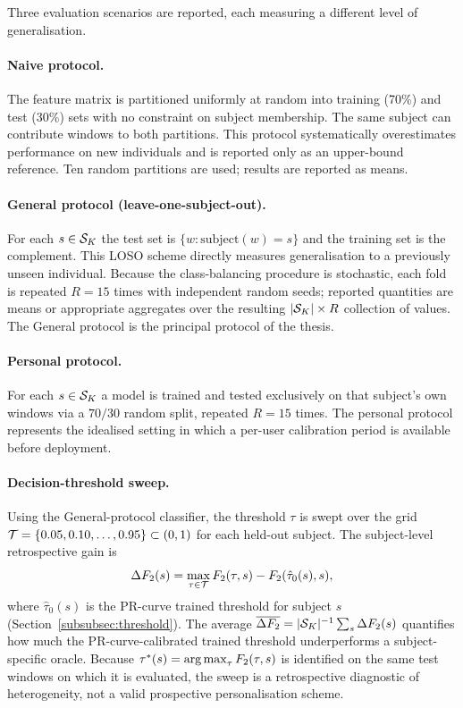 Three evaluation scenarios are reported, each measuring a different level of generalisation.

\paragraph{Naive protocol.}
The feature matrix is partitioned uniformly at random into training (70\%) and test (30\%) sets with no constraint on subject membership. The same subject can contribute windows to both partitions. This protocol systematically overestimates performance on new individuals and is reported only as an upper-bound reference. Ten random partitions are used; results are reported as means.

\paragraph{General protocol (leave-one-subject-out).}
For each $s\in\mathcal{S}_K$ the test set is $\{w:\text{subject}(w)=s\}$ and the training set is the complement. This LOSO scheme directly measures generalisation to a previously unseen individual. Because the class-balancing procedure is stochastic, each fold is repeated $R=15$ times with independent random seeds; reported quantities are means or appropriate aggregates over the resulting $|\mathcal{S}_K|\times R$ collection of values. The General protocol is the principal protocol of the thesis.

\paragraph{Personal protocol.}
For each $s\in\mathcal{S}_K$ a model is trained and tested exclusively on that subject's own windows via a $70/30$ random split, repeated $R=15$ times. The personal protocol represents the idealised setting in which a per-user calibration period is available before deployment.

\paragraph{Decision-threshold sweep.}
Using the General-protocol classifier, the threshold $\tau$ is swept over the grid $\mathcal{T}=\{0.05,0.10,\ldots,0.95\}\subset(0,1)$ for each held-out subject. The subject-level retrospective gain is
\begin{equation}
  \Delta F_2(s)=\max_{\tau\in\mathcal{T}}F_2(\tau,s)-F_2(\hat\tau_0(s),s),
  \label{eq:dF2}
\end{equation}
where $\hat\tau_0(s)$ is the PR-curve trained threshold for subject $s$ (Section~\ref{subsubsec:threshold}). The average $\overline{\Delta F_2}=|\mathcal{S}_K|^{-1}\sum_s\Delta F_2(s)$ quantifies how much the PR-curve-calibrated trained threshold underperforms a subject-specific oracle. Because $\tau^*(s)=\operatorname*{arg\,max}_\tau F_2(\tau,s)$ is identified on the same test windows on which it is evaluated, the sweep is a retrospective diagnostic of heterogeneity, not a valid prospective personalisation scheme.

